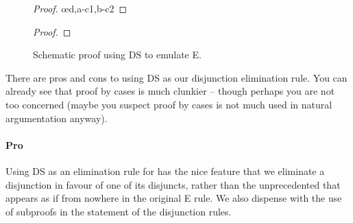 \begin{figure}
\begin{minipage}{0.45\textwidth}
	\begin{proof}
	\have[\ ]{}{\vdots}
	\open
	\close
	\open
	\close
	\oe{d,a-c1,b-c2}
\end{proof}
\caption{Schematic {\eor}E proof.\label{DSa}}
\end{minipage} \qquad\begin{minipage}{0.45\textwidth}
		\begin{proof}
	\open
	\have[\ ]{}{\vdots}
	\open
	\have[\ ]{}{\vdots}
	\close
	\have[\ ]{}{\vdots}
	\close
\end{proof}
		\caption{Schematic proof using DS to emulate {\eor}E.\label{DSb}}
\end{minipage}
	\end{figure}

There are pros and cons to using DS as our disjunction elimination rule. You can already see that proof by cases is much clunkier – though perhaps you are not too concerned (maybe you suspect proof by cases is not much used in natural argumentation anyway). 
\paragraph{Pro} Using DS as an elimination rule for {\eor} has the nice feature that we eliminate a disjunction in favour of one of its disjuncts, rather than the unprecedented  that appears as if from nowhere in the original {\eor}E rule. We also dispense with the use of subproofs in the statement of the disjunction rules.
